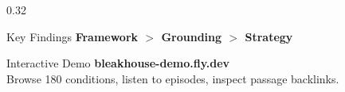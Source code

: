 \documentclass[final]{beamer}
\begin{document}
\begin{frame}[t]
\begin{columns}[t]
\begin{column}{0.32\textwidth}
\begin{block}{Key Findings}
    \vspace{5pt}
    \textbf{Framework $>$ Grounding $>$ Strategy}
\end{block}

\begin{block}{Interactive Demo}
    \centering
    \textbf{bleakhouse-demo.fly.dev} \\
    Browse 180 conditions, listen to episodes, inspect passage backlinks.
\end{block}

\end{column}

\end{columns}

\end{frame}
\end{document}
